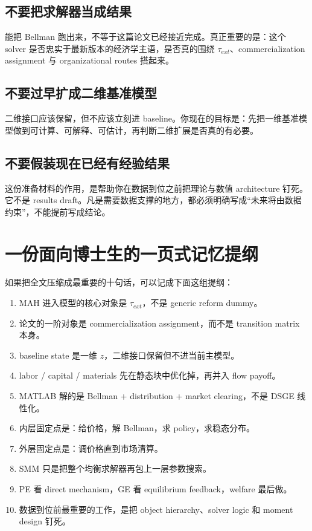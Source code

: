 \documentclass[12pt]{ctexart}
\newcommand{\tauext}{\tau_{ext}}
\begin{document}
\subsection{不要把求解器当成结果}
能把 Bellman 跑出来，不等于这篇论文已经接近完成。真正重要的是：这个 solver 是否忠实于最新版本的经济学主语，是否真的围绕 $\tauext$、commercialization assignment 与 organizational routes 搭起来。

\subsection{不要过早扩成二维基准模型}
二维接口应该保留，但不应该立刻进 baseline。你现在的目标是：先把一维基准模型做到可计算、可解释、可估计，再判断二维扩展是否真的有必要。

\subsection{不要假装现在已经有经验结果}
这份准备材料的作用，是帮助你在数据到位之前把理论与数值 architecture 钉死。它不是 results draft。凡是需要数据支撑的地方，都必须明确写成“未来将由数据约束”，不能提前写成结论。

\section{一份面向博士生的一页式记忆提纲}

如果把全文压缩成最重要的十句话，可以记成下面这组提纲：

\begin{enumerate}[leftmargin=2em,itemsep=0.28em]
    \item MAH 进入模型的核心对象是 $\tauext$，不是 generic reform dummy。
    \item 论文的一阶对象是 commercialization assignment，而不是 transition matrix 本身。
    \item baseline state 是一维 $z$，二维接口保留但不进当前主模型。
    \item labor / capital / materials 先在静态块中优化掉，再并入 flow payoff。
    \item MATLAB 解的是 Bellman + distribution + market clearing，不是 DSGE 线性化。
    \item 内层固定点是：给价格，解 Bellman，求 policy，求稳态分布。
    \item 外层固定点是：调价格直到市场清算。
    \item SMM 只是把整个均衡求解器再包上一层参数搜索。
    \item PE 看 direct mechanism，GE 看 equilibrium feedback，welfare 最后做。
    \item 数据到位前最重要的工作，是把 object hierarchy、solver logic 和 moment design 钉死。
\end{enumerate}
\end{document}
